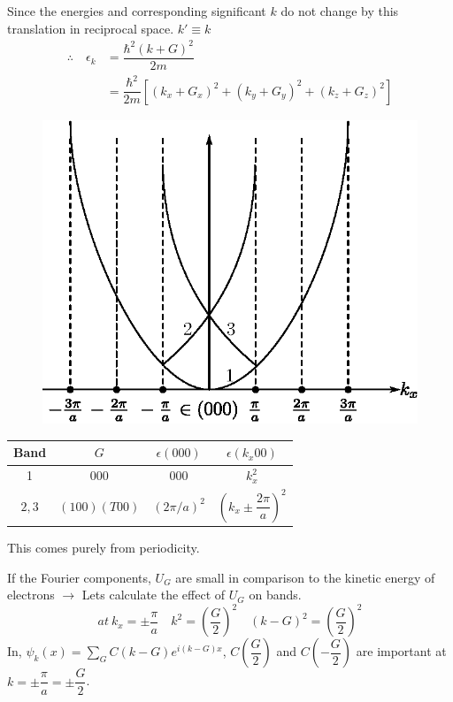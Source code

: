 Since the energies and corresponding significant $k$ do not change by this translation in reciprocal space. $k'\equiv k$
\begin{align*}
\therefore\quad \epsilon_{k} &= \dfrac{\hbar^{2}(k+G)^{2}}{2m}\\
&= \dfrac{\hbar^{2}}{2m}\left[(k_{x}+G_{x})^{2}+(k_{y}+G_{y})^{2}+(k_{z}+G_{z})^{2}\right]
\end{align*}
\begin{figure}[H]
\centering
\includegraphics{images/lecture21/fig5.eps}
\end{figure}
\begin{center}
\begin{tabular}{cccc}
\hline
{\bf Band} & {\boldmath$G$} & {\boldmath$\epsilon(000)$} & {\boldmath$\epsilon(k_{x}00)$}\\
\hline
1 & 000 & 000 & $k^{2}_{x}$\\
$2,3$ & $(100)(T00)$ & $(2\pi/a)^{2}$ & $\left(k_{x}\pm \dfrac{2\pi}{a}\right)^{2}$\\
\hline
\end{tabular}
\end{center}
This comes purely from periodicity.

If the Fourier components, $U_{G}$ are small in comparison to the kinetic energy of electrons $\to$ Lets calculate the effect of $U_{G}$ on bands.
$$
at \ k_{x}=\pm \dfrac{\pi}{a}\quad k^{2}=\left(\dfrac{G}{2}\right)^{2}\quad (k-G)^{2}=\left(\dfrac{G}{2}\right)^{2}
$$
In, $\psi_{k}(x)=\sum\limits_{G}C(k-G)e^{i(k-G)x}$, $C\left(\dfrac{G}{2}\right)$ and $C\left(-\dfrac{G}{2}\right)$ are important at $k=\pm \dfrac{\pi}{a}=\pm \dfrac{G}{2}$.

